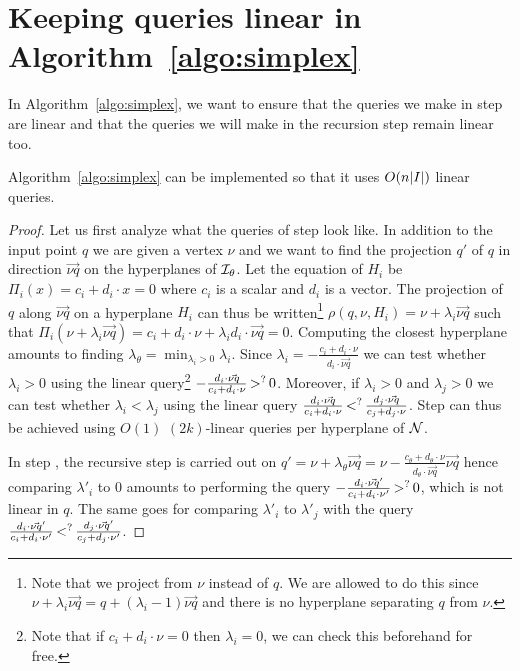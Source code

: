 \section{Keeping queries linear in Algorithm~\ref*{algo:simplex}}
\label{app:keeplinear}
In Algorithm~\ref{algo:simplex}, we want to ensure that the queries we make in step
 are linear and that the queries we will make in the recursion step
remain linear too.
\begin{lemma}
	Algorithm~\ref{algo:simplex} can be implemented so that it uses $O(n|{I}|)$ linear queries.
\end{lemma}%
\begin{proof}
Let us first analyze what the queries of step  look like. In addition
to the input point \(q\) we are given a vertex \(\nu\) and we want to find the
projection \(q'\) of \(q\) in direction \(\vec{\nu q}\) on the hyperplanes of
\(\mathcal{I}_{\theta}\). Let the equation of \(H_{i}\) be \(\Pi_{i}(x) =
c_{i} + d_{i}
\cdot x = 0\) where \(c_{i}\) is a scalar and \(d_{i}\) is a
vector.
The projection of \(q\) along \(\vec{\nu q}\) on a hyperplane \(H_i\) can thus
be written\footnote{Note that we project from \(\nu\) instead of \(q\). We are
allowed to do this since \(\nu + \lambda_{i} \vec{\nu q} = q + (\lambda_i - 1)
\vec{\nu q}\) and there is no hyperplane
separating \(q\) from \(\nu\).}
\(\rho(q,\nu,H_i) = \nu + \lambda_{i} \vec{\nu q}\) such that \(\Pi_{i}(\nu +
		\lambda_{i} \vec{\nu q}) = c_{i} + d_{i} \cdot \nu +
		\lambda_{i} d_{i} \cdot
\vec{\nu q} = 0\). Computing the closest hyperplane amounts to finding
\(\lambda_{\theta} = \min_{\lambda_i > 0} \lambda_i\). Since \(\lambda_i = -
\frac{c_i + d_i \cdot \nu}{d_i \cdot \vec{\nu q}}\) we can test whether
\(\lambda_i > 0\)
using the linear query\footnote{Note that if $c_i + d_i \cdot \nu = 0$ then
$\lambda_i=0$, we can check this beforehand for free.}
\(-\frac{d_i \cdot \vec{\nu q}}{c_i + d_i
\cdot \nu} \mathop{>}^{?} 0\). Moreover, if \(\lambda_i > 0\) and \(\lambda_j > 0\)
we can test whether $\lambda_i < \lambda_j$ using the linear query \(
\frac{d_i \cdot \vec{\nu q}}{c_i + d_i \cdot \nu}
\mathop{<}^{?}
\frac{d_j \cdot \vec{\nu q}}{c_j + d_j \cdot \nu}\).
Step  can thus be achieved using \(O(1)\) \((2k)\)-linear queries per
hyperplane of \(\mathcal{N}\).

In step , the
recursive step is carried out on \(q' = \nu + \lambda_{\theta} \vec{\nu q} = \nu -
\frac{c_{\theta} + d_{\theta} \cdot \nu}{d_{\theta} \cdot \vec{\nu q}}
\vec{\nu q}\) hence comparing \(\lambda'_i\) to \(0\) amounts to performing the
query \(-\frac{d_i \cdot \vec{\nu q}'}{c_i + d_i \cdot \nu'}
\mathop{>}^{?} 0\), which is not linear in \(q\). The same goes for comparing
\(\lambda'_i\) to \(\lambda'_j\) with the query
\(\frac{d_i \cdot \vec{\nu q}'}{c_i + d_i \cdot \nu'}
\mathop{<}^{?}
\frac{d_j \cdot \vec{\nu q}'}{c_j + d_j \cdot \nu'}\).


\end{proof}
